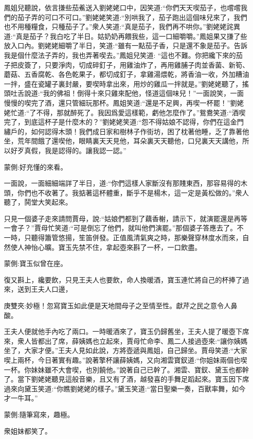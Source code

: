 \begin{parag}
鳳姐兒聽說，依言搛些茄鮺送入劉姥姥口中，因笑道:“你們天天喫茄子，也嚐嚐我們的茄子弄的可口不可口。”劉姥姥笑道:“別哄我了，茄子跑出這個味兒來了，我們也不用種糧食，只種茄子了。”衆人笑道:“真是茄子，我們再不哄你。”劉姥姥詫異道:“真是茄子？我白吃了半日。姑奶奶再餵我些，這一口細嚼嚼。”鳳姐果又搛了些放入口內。劉姥姥細嚼了半日，笑道:“雖有一點茄子香，只是還不象是茄子。告訴我是個什麼法子弄的，我也弄著喫去。”鳳姐兒笑道: “這也不難。你把纔下來的茄子把皮簽了，只要淨肉，切成碎釘子，用雞油炸了，再用雞脯子肉並香菌、新筍、蘑菇、五香腐乾、各色乾果子，都切成釘子，拿雞湯煨乾，將香油一收，外加糟油一拌，盛在瓷罐子裏封嚴，要喫時拿出來，用炒的雞瓜一拌就是。”劉姥姥聽了，搖頭吐舌說道:“我的佛祖！倒得十來只雞來配他，怪道這個味兒！”一面說笑，一面慢慢的喫完了酒，還只管細玩那杯。鳳姐笑道:“還是不足興，再喫一杯罷！”劉姥姥忙道:“了不得，那就醉死了。我因爲愛這樣範，虧他怎麼作了。”鴛鴦笑道:“酒喫完了，到底這杯子是什麼木的？”劉姥姥笑道:“怨不得姑娘不認得，你們在這金門繡戶的，如何認得木頭！我們成日家和樹林子作街坊，困了枕著他睡，乏了靠著他坐，荒年間餓了還喫他，眼睛裏天天見他，耳朵裏天天聽他，口兒裏天天講他，所以好歹真假，我是認得的。讓我認一認。”\begin{note}蒙側:好充懂的來看。\end{note}一面說，一面細細端詳了半日，道:“你們這樣人家斷沒有那賤東西，那容易得的木頭，你們也不收著了。我掂著這杯體重，斷乎不是楊木，這一定是黃松做的。”衆人聽了，鬨堂大笑起來。
\end{parag}


\begin{parag}
    只見一個婆子走來請問賈母，說:“姑娘們都到了藕香榭，請示下，就演罷還是再等一會子？”賈母忙笑道:“可是倒忘了他們，就叫他們演罷。”那個婆子答應去了。不一時，只聽得簫管悠揚，笙笛併發。正值風清氣爽之時，那樂聲穿林度水而來，自然使人神怡心曠。寶玉先禁不住，拿起壺來斟了一杯，一口飲盡。\begin{note}蒙側:寶玉似曾在座。\end{note}復又斟上，纔要飲，只見王夫人也要飲，命人換暖酒，寶玉連忙將自己的杯捧了過來，送到王夫人口邊，\begin{note}庚雙夾:妙極！忽寫寶玉如此便是天地間母子之至情至性。獻芹之民之意令人鼻酸。\end{note}王夫人便就他手內吃了兩口。一時暖酒來了，寶玉仍歸舊坐，王夫人提了暖壺下席來，衆人皆都出了席，薛姨媽也立起來，賈母忙命李、鳳二人接過壺來:“讓你姨媽坐了，大家才便。”王夫人見如此說，方將壺遞與鳳姐，自己歸坐。賈母笑道:“大家喫上兩杯，今日著實有趣。”說著擎杯讓薛姨媽，又向湘雲寶釵道:“你姐妹兩個也喫一杯。你妹妹雖不大會喫，也別饒他。”說著自己已幹了。湘雲、寶釵、黛玉也都幹了。當下劉姥姥聽見這般音樂，且又有了酒，越發喜的手舞足蹈起來。寶玉因下席過來向黛玉笑道:“你瞧劉姥姥的樣子。”黛玉笑道:“當日聖樂一奏，百獸率舞，如今才一牛耳。”\begin{note}蒙側:隨筆寫來，趣極。\end{note}衆姐妹都笑了。
\end{parag}



